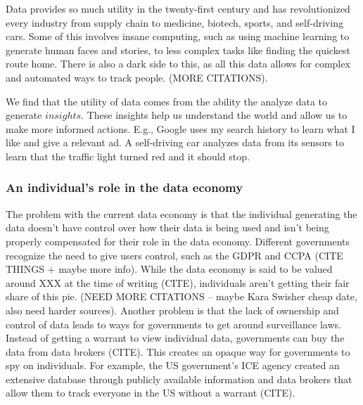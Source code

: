 Data provides so much utility in the twenty-first century and has revolutionized every industry from supply chain to medicine, biotech, sports, and self-driving cars. Some of this involves insane computing, such as using machine learning to generate human faces and stories, to less complex tasks like finding the quickest route home. There is also a dark side to this, as all this data allows for complex and automated ways to track people. (MORE CITATIONS). 

We find that the utility of data comes from the ability the analyze data to generate $\mathit{insights}$. These insights help us understand the world and allow us to make more informed actions. E.g., Google uses my search history to learn what I like and give a relevant ad. A self-driving car analyzes data from its sensors to learn that the traffic light turned red and it should stop.

\subsubsection{An individual's role in the data economy} 
The problem with the current data economy is that the individual generating the data doesn't have control over how their data is being used and isn't being properly compensated for their role in the data economy. Different governments recognize the need to give users control, such as the GDPR and CCPA (CITE THINGS + maybe more info). While the data economy is said to be valued around XXX at the time of writing (CITE), individuals aren't getting their fair share of this pie. (NEED MORE CITATIONS -- maybe Kara Swisher cheap date, also need harder sources). 
\newline
\newline
Another problem is that the lack of ownership and control of data leads to ways for governments to get around surveillance laws. Instead of getting a warrant to view individual data, governments can buy the data from data brokers (CITE). This creates an opaque way for governments to spy on individuals. For example, the US government's ICE agency created an extensive database through publicly available information and data brokers that allow them to track everyone in the US without a warrant (CITE). 



